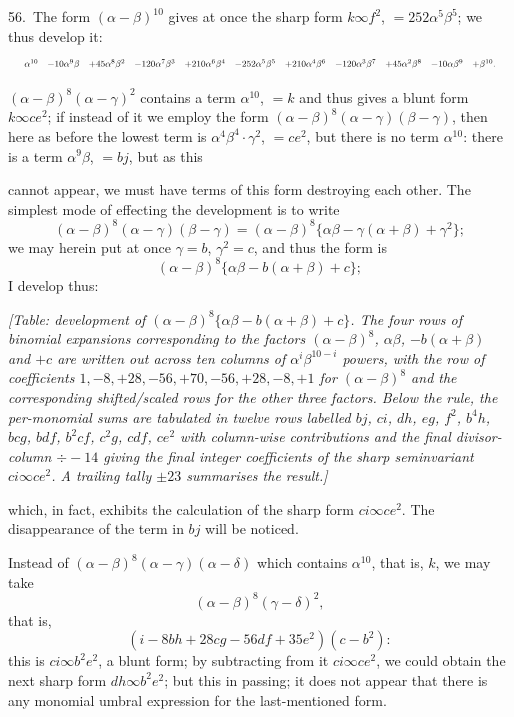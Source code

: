 \documentclass[11pt]{article}
\begin{document}
56.\ The form $(\alpha - \beta)^{10}$ gives at once the sharp form $k \infty f^2$, $= 252\alpha^5\beta^5$; we thus develop it:
\[
\resizebox{\textwidth}{!}{$\displaystyle
\begin{array}{cccccccccccc}
\alpha^{10} & -10\alpha^9\beta & +45\alpha^8\beta^2 & -120\alpha^7\beta^3 & +210\alpha^6\beta^4 & -252\alpha^5\beta^5 & +210\alpha^4\beta^6 & -120\alpha^3\beta^7 & +45\alpha^2\beta^8 & -10\alpha\beta^9 & +\beta^{10}.
\end{array}
$}
\]

$(\alpha - \beta)^8 (\alpha - \gamma)^2$ contains a term $\alpha^{10}$, $= k$ and thus gives a blunt form $k \infty ce^2$; if instead of it we employ the form $(\alpha - \beta)^8 (\alpha - \gamma)(\beta - \gamma)$, then here as before the lowest term is $\alpha^4\beta^4 \cdot \gamma^2$, $= ce^2$, but there is no term $\alpha^{10}$: there is a term $\alpha^9\beta$, $= bj$, but as this

cannot appear, we must have terms of this form destroying each other. The simplest mode of effecting the development is to write
\[
(\alpha - \beta)^8 (\alpha - \gamma)(\beta - \gamma) = (\alpha - \beta)^8 \{\alpha\beta - \gamma(\alpha + \beta) + \gamma^2\};
\]
we may herein put at once $\gamma = b$, $\gamma^2 = c$, and thus the form is
\[
(\alpha - \beta)^8 \{\alpha\beta - b(\alpha + \beta) + c\};
\]
I develop thus:

\textit{[Table: development of $(\alpha - \beta)^8 \{\alpha\beta - b(\alpha + \beta) + c\}$. The four rows of binomial expansions corresponding to the factors $(\alpha - \beta)^8$, $\alpha\beta$, $-b(\alpha + \beta)$ and $+c$ are written out across ten columns of $\alpha^i\beta^{10-i}$ powers, with the row of coefficients $1, -8, +28, -56, +70, -56, +28, -8, +1$ for $(\alpha - \beta)^8$ and the corresponding shifted/scaled rows for the other three factors. Below the rule, the per-monomial sums are tabulated in twelve rows labelled $bj$, $ci$, $dh$, $eg$, $f^2$, $b^4h$, $bcg$, $bdf$, $b^2cf$, $c^2g$, $cdf$, $ce^2$ with column-wise contributions and the final divisor-column $\div -14$ giving the final integer coefficients of the sharp seminvariant $ci \infty ce^2$. A trailing tally $\pm 23$ summarises the result.]}

\medskip
which, in fact, exhibits the calculation of the sharp form $ci \infty ce^2$. The disappearance of the term in $bj$ will be noticed.

\clearpage
Instead of $(\alpha - \beta)^8 (\alpha - \gamma)(\alpha - \delta)$ which contains $\alpha^{10}$, that is, $k$, we may take
\[
(\alpha - \beta)^8 (\gamma - \delta)^2,
\]
that is,
\[
(i - 8bh + 28cg - 56df + 35e^2)(c - b^2):
\]
this is $ci \infty b^2e^2$, a blunt form; by subtracting from it $ci \infty ce^2$, we could obtain the next sharp form $dh \infty b^2e^2$; but this in passing; it does not appear that there is any monomial umbral expression for the last-mentioned form.
\end{document}
